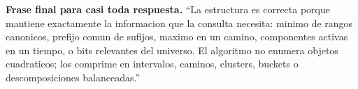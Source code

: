 \documentclass[10pt]{article}
\newcommand{\boxhead}[1]{\vspace{3pt}\textbf{#1.}}
\begin{document}
\boxhead{Frase final para casi toda respuesta}
``La estructura es correcta porque mantiene exactamente la informacion que la consulta necesita: minimo de
rangos canonicos, prefijo comun de sufijos, maximo en un camino, componentes activas en un tiempo, o bits
relevantes del universo. El algoritmo no enumera objetos cuadraticos; los comprime en intervalos, caminos,
clusters, buckets o descomposiciones balanceadas.''
\end{document}
